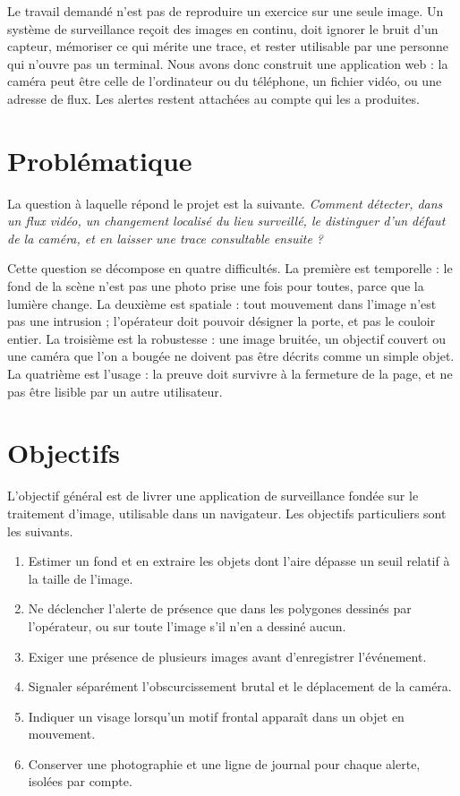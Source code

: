Le travail demandé n'est pas de reproduire un exercice sur une seule image. Un système de surveillance reçoit des images en continu, doit ignorer le bruit d'un capteur, mémoriser ce qui mérite une trace, et rester utilisable par une personne qui n'ouvre pas un terminal. Nous avons donc construit une application web : la caméra peut être celle de l'ordinateur ou du téléphone, un fichier vidéo, ou une adresse de flux. Les alertes restent attachées au compte qui les a produites.

\section{Problématique}

La question à laquelle répond le projet est la suivante. \emph{Comment détecter, dans un flux vidéo, un changement localisé du lieu surveillé, le distinguer d'un défaut de la caméra, et en laisser une trace consultable ensuite ?}

Cette question se décompose en quatre difficultés. La première est temporelle : le fond de la scène n'est pas une photo prise une fois pour toutes, parce que la lumière change. La deuxième est spatiale : tout mouvement dans l'image n'est pas une intrusion ; l'opérateur doit pouvoir désigner la porte, et pas le couloir entier. La troisième est la robustesse : une image bruitée, un objectif couvert ou une caméra que l'on a bougée ne doivent pas être décrits comme un simple objet. La quatrième est l'usage : la preuve doit survivre à la fermeture de la page, et ne pas être lisible par un autre utilisateur.

\section{Objectifs}

L'objectif général est de livrer une application de surveillance fondée sur le traitement d'image, utilisable dans un navigateur. Les objectifs particuliers sont les suivants.

\begin{enumerate}
  \item Estimer un fond et en extraire les objets dont l'aire dépasse un seuil relatif à la taille de l'image.
  \item Ne déclencher l'alerte de présence que dans les polygones dessinés par l'opérateur, ou sur toute l'image s'il n'en a dessiné aucun.
  \item Exiger une présence de plusieurs images avant d'enregistrer l'événement.
  \item Signaler séparément l'obscurcissement brutal et le déplacement de la caméra.
  \item Indiquer un visage lorsqu'un motif frontal apparaît dans un objet en mouvement.
  \item Conserver une photographie et une ligne de journal pour chaque alerte, isolées par compte.
\end{enumerate}

